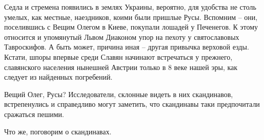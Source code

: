 Седла и стремена появились в землях Украины, вероятно, для удобства не столь умелых, как местные, наездников, коими были пришлые Русы.  Вспомним – они, поселившись с Вещим Олегом в Киеве, покупали лошадей у Печенегов. К этому относится и упомянутый Львом Диаконом упор на пехоту у святославовых Тавроскифов. А быть может, причина иная – другая привычка верховой езды. Кстати, шпоры впервые среди Славян начинают встречаться у прежнего, славянского населения нынешней Австрии только в 8 веке нашей эры, как следует из найденных погребений. 

Вещий Олег, Русы? Исследователи, склонные видеть в них скандинавов, встрепенулись и справедливо могут заметить, что скандинавы таки предпочитали сражаться пешими.

Что же, поговорим о скандинавах.

